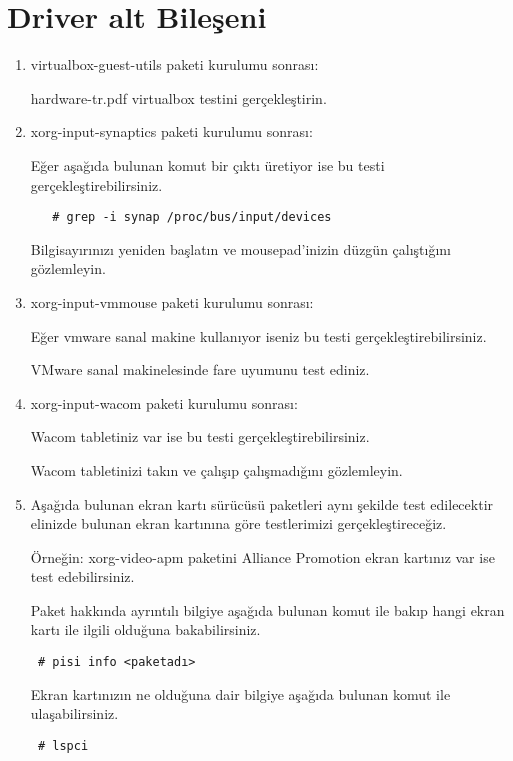 \documentclass[a4paper,10pt]{article}
\begin{document}
\section{Driver alt Bileşeni}
\begin{enumerate}
 \item virtualbox-guest-utils paketi kurulumu sonrası:

hardware-tr.pdf virtualbox testini gerçekleştirin.

 \item xorg-input-synaptics  paketi kurulumu sonrası:

Eğer aşağıda bulunan komut bir çıktı üretiyor ise bu testi gerçekleştirebilirsiniz.
  \begin{verbatim}
   # grep -i synap /proc/bus/input/devices
  \end{verbatim}

Bilgisayırınızı yeniden başlatın ve mousepad'inizin düzgün çalıştığını gözlemleyin. 

\item xorg-input-vmmouse paketi kurulumu sonrası:

Eğer vmware sanal makine kullanıyor iseniz bu testi gerçekleştirebilirsiniz. 

VMware sanal makinelesinde fare uyumunu test ediniz.

\item xorg-input-wacom paketi kurulumu sonrası:

Wacom tabletiniz var ise bu testi gerçekleştirebilirsiniz.

Wacom tabletinizi takın ve çalışıp çalışmadığını gözlemleyin.

\item Aşağıda bulunan ekran kartı sürücüsü paketleri aynı şekilde test edilecektir elinizde bulunan ekran kartınına göre testlerimizi gerçekleştireceğiz. 

Örneğin: xorg-video-apm paketini Alliance Promotion ekran kartınız var ise test edebilirsiniz.

Paket hakkında ayrıntılı bilgiye aşağıda bulunan komut ile bakıp hangi ekran kartı ile ilgili olduğuna bakabilirsiniz.
\begin{verbatim}
 # pisi info <paketadı>
\end{verbatim}

Ekran kartınızın ne olduğuna dair bilgiye aşağıda bulunan komut ile ulaşabilirsiniz.
\begin{verbatim}
 # lspci
\end{verbatim}


\end{enumerate}
\end{document}
